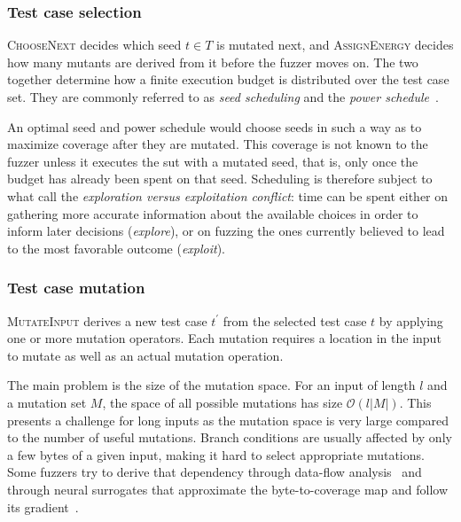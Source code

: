 \subsubsection{Test case selection}

\textsc{ChooseNext} decides which seed $t \in T$ is mutated next, and
\textsc{AssignEnergy} decides how many mutants are derived from it before the fuzzer moves
on.
The two together determine how a finite execution budget is distributed over the test case
set.
They are commonly referred to as \emph{seed scheduling} and the \emph{power
schedule}~\cite{manes_art_2019,bohme_coverage-based_2016}.

An optimal seed and power schedule would choose seeds in such a way as to maximize coverage
after they are mutated.
This coverage is not known to the fuzzer unless it executes the \gls{sut} with a mutated seed,
that is, only once the budget has already been spent on that seed.
Scheduling is therefore subject to what \textcite{manes_art_2019} call the
\emph{exploration versus exploitation conflict}: time can be spent either on gathering more
accurate information about the available choices in order to inform later decisions
(\emph{explore}), or on fuzzing the ones currently believed to lead to the most favorable
outcome (\emph{exploit}).

\subsubsection{Test case mutation}

\textsc{MutateInput} derives a new test case $t^\prime$ from the selected test case $t$ by
applying one or more mutation operators.
Each mutation requires a location in the input to mutate as well as an actual mutation operation.

The main problem is the size of the mutation space.
For an input of length $l$ and a mutation set $M$, the space of all possible mutations has size $\mathcal{O}(l\lvert M\rvert)$.
This presents a challenge for long inputs as the mutation space is very large compared to the number of useful mutations.
Branch conditions are usually affected by only a few bytes of a given input, making it hard to select appropriate mutations.
Some fuzzers try to derive that dependency through data-flow
analysis~\cite{gan_greyone_nodate} and through neural surrogates that
approximate the
byte-to-coverage map and follow its gradient~\cite{she_neuzz_2019,she_mtfuzz_2020}.

